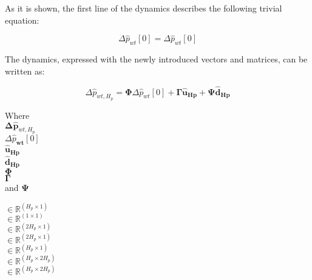 As it is shown, the first line of the dynamics describes the following trivial equation:

\begin{equation}
\Delta {\hat{p}_{wt}[0]} = \Delta {\hat{p}_{wt}[0]}
\end{equation} 

The dynamics, expressed with the newly introduced vectors and matrices, can be written as: 

\begin{equation}
	\Delta \hat{p}_{wt,H_p} = \bm{\Phi} \Delta \hat{p}_{wt}[0] + \bm{\Gamma} \bm{\hat{u}}_{\bm{Hp}} + \bm{\Psi} \bm{\hat{d}}_{\bm{Hp}}
	\label{extendedmatrix}
\end{equation}


\begin{minipage}[t]{0.15\textwidth}
Where\\
\hspace*{8mm} $\bm{\Delta \hat{p}}_{wt,H_p} $ \\\newline
\hspace*{8mm} $\Delta \hat{p}_{\bm{wt}}[0] $ \\\newline
\hspace*{8mm} $\bm{\hat{u}_{\bm{Hp}}}$ \\\newline
\hspace*{8mm} $\bm{\hat{d}_{\bm{Hp}}}$ \\\newline
\hspace*{8mm} $\bm{\Phi}$ \\\newline
\hspace*{8mm} $\bm{\Gamma}$ \\\newline
and \hspace*{0.7mm} $\bm{\Psi} $ 
\end{minipage}
\begin{minipage}[t]{0.16\textwidth}
\vspace*{2mm}
$\in \pmb{\mathbb{R}}^{(H_p \times 1)}$ \\\newline
$\in \mathbb{R}^{(1 \times 1)}$ \\\newline
$\in \pmb{\mathbb{R}}^{(2 H_p \times 1)}$ \\\newline
$\in \pmb{\mathbb{R}}^{(2 H_p \times 1)}$ \\\newline
$\in \pmb{\mathbb{R}}^{(H_p \times 1)}$ \\\newline
$\in \pmb{\mathbb{R}}^{(H_p \times 2 H_p)}$ \\\newline
$\in \pmb{\mathbb{R}}^{(H_p \times 2 H_p)}$ 
\end{minipage}
